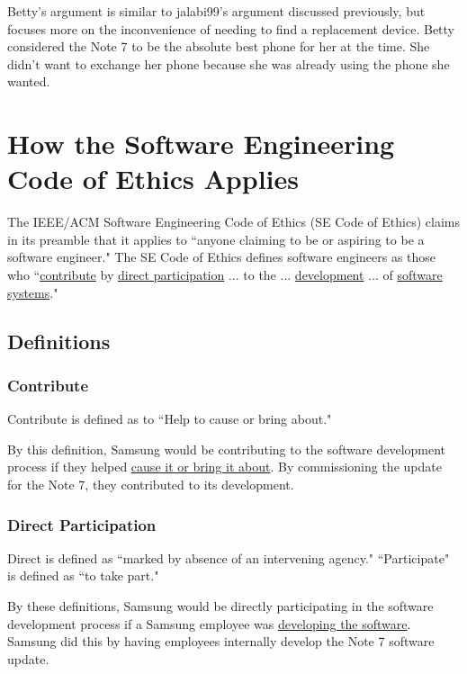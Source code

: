\documentclass[12pt]{article}
\begin{document}
      	Betty's argument is similar to jalabi99's argument discussed previously, but focuses more on the inconvenience of needing to find a replacement device. Betty considered the Note 7 to be the absolute best phone for her at the time. She didn't want to exchange her phone because she was already using the phone she wanted\cite{mashableMiguelinaBetty}.
      

\section{How the Software Engineering Code of Ethics Applies}

   The IEEE/ACM Software Engineering Code of Ethics (SE Code of Ethics) claims in its preamble that it applies to ``anyone claiming to be or aspiring to be a software engineer."\cite{codeOfEthics} The SE Code of Ethics defines software engineers as those who ``\uline{contribute} by \uline{direct participation} ... to the ... \uline{development} ... of \uline{software systems}."\cite{codeOfEthics}
   
   \subsection{Definitions}
   
   	\subsubsection{Contribute}
   	Contribute is defined as to ``Help to cause or bring about."\cite{oxfordDefineContritute}
	
	By this definition, Samsung would be contributing to the software development process if they helped \uline{cause it or bring it about}. By commissioning the update for the Note 7, they contributed to its development\cite{samsungModifiedAndroid}.
	
	\subsubsection{Direct Participation}
	Direct is defined as ``marked by absence of an intervening agency."\cite{merriamDefineDirect} ``Participate" is defined as ``to take part."\cite{merriamDefineParticipate}
	
	By these definitions, Samsung would be directly participating in the software development process if a Samsung employee was \uline{developing the software}. Samsung did this by having employees internally develop the Note 7 software update\cite{mashableMiguelinaBetty}.
	
\end{document}
